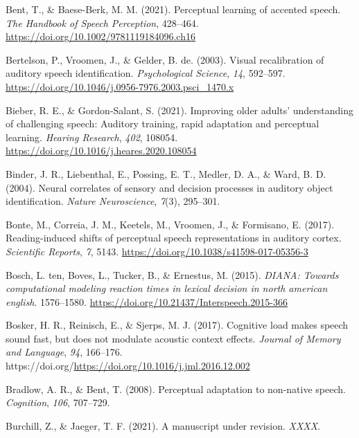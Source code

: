 \documentclass[
  11pt,
  english,
  man,floatsintext]{apa6}
\newlength{\cslhangindent}
\newlength{\cslentryspacingunit} %
\newenvironment{CSLReferences}[2] %
 {%
  \setlength{\parindent}{0pt}
  \ifodd #1
  \let\oldpar\par
  \def\par{\hangindent=\cslhangindent\oldpar}
  \fi
  \setlength{\parskip}{#2\cslentryspacingunit}
 }%
 {}
\begin{document}
\begin{CSLReferences}{1}{0}
\leavevmode{}%
Bent, T., \& Baese-Berk, M. M. (2021). Perceptual learning of accented speech. \emph{The Handbook of Speech Perception}, 428--464. \url{https://doi.org/10.1002/9781119184096.ch16}

\leavevmode{}%
Bertelson, P., Vroomen, J., \& Gelder, B. de. (2003). Visual recalibration of auditory speech identification. \emph{Psychological Science}, \emph{14}, 592--597. \url{https://doi.org/10.1046/j.0956-7976.2003.psci_1470.x}

\leavevmode{}%
Bieber, R. E., \& Gordon-Salant, S. (2021). Improving older adults' understanding of challenging speech: Auditory training, rapid adaptation and perceptual learning. \emph{Hearing Research}, \emph{402}, 108054. \url{https://doi.org/10.1016/j.heares.2020.108054}

\leavevmode{}%
Binder, J. R., Liebenthal, E., Possing, E. T., Medler, D. A., \& Ward, B. D. (2004). Neural correlates of sensory and decision processes in auditory object identification. \emph{Nature Neuroscience}, \emph{7}(3), 295--301.

\leavevmode{}%
Bonte, M., Correia, J. M., Keetels, M., Vroomen, J., \& Formisano, E. (2017). Reading-induced shifts of perceptual speech representations in auditory cortex. \emph{Scientific Reports}, \emph{7}, 5143. \url{https://doi.org/10.1038/s41598-017-05356-3}

\leavevmode{}%
Bosch, L. ten, Boves, L., Tucker, B., \& Ernestus, M. (2015). \emph{DIANA: Towards computational modeling reaction times in lexical decision in north american english}. 1576--1580. \url{https://doi.org/10.21437/Interspeech.2015-366}

\leavevmode{}%
Bosker, H. R., Reinisch, E., \& Sjerps, M. J. (2017). Cognitive load makes speech sound fast, but does not modulate acoustic context effects. \emph{Journal of Memory and Language}, \emph{94}, 166--176. https://doi.org/\url{https://doi.org/10.1016/j.jml.2016.12.002}

\leavevmode{}%
Bradlow, A. R., \& Bent, T. (2008). Perceptual adaptation to non-native speech. \emph{Cognition}, \emph{106}, 707--729.

\leavevmode{}%
Burchill, Z., \& Jaeger, T. F. (2021). A manuscript under revision. \emph{XXXX}.


\end{CSLReferences}
\end{document}
